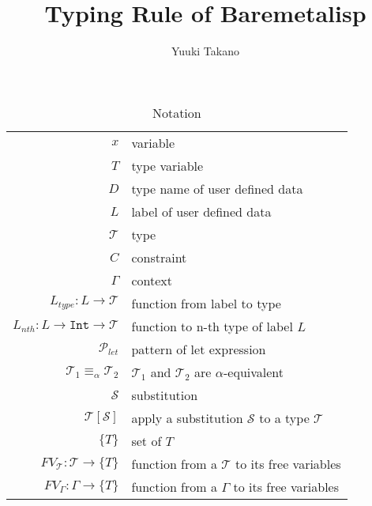 \documentclass{article}
\title{Typing Rule of Baremetalisp}
\author{Yuuki Takano}
\begin{document}
\maketitle

\begin{table}[tb]
\caption{Notation}
    \centering
    \begin{tabular}{rl}
        $x$ & variable \\
        $T$ & type variable \\
        $D$ & type name of user defined data \\
        $L$ & label of user defined data \\
        $\mathcal{T}$ & type \\
        $C$ & constraint \\
        $\Gamma$ & context \\
        $L_{type} : L \rightarrow \mathcal{T}$ & function from label to type \\
        $L_{nth} : L \rightarrow \mathtt{Int} \rightarrow \mathcal{T}$ & function to n-th type of label $L$ \\
        $\mathcal{P}_{let}$ & pattern of let expression \\
        $\mathcal{T}_1 \equiv_\alpha \mathcal{T}_2$ & $\mathcal{T}_1$ and $\mathcal{T}_2$ are $\alpha$-equivalent \\
        $\mathcal{S}$ & substitution \\
        $\mathcal{T}[\mathcal{S}]$ & apply a substitution $\mathcal{S}$ to a type $\mathcal{T}$ \\
        $\{T\}$ & set of $T$ \\
        $FV_\mathcal{T} : \mathcal{T} \rightarrow \{T\}$ & function from a $\mathcal{T}$ to its free variables\\
        $FV_\Gamma : \Gamma \rightarrow \{T\}$ & function from a $\Gamma$ to its free variables\\
    \end{tabular}
\end{table}
\end{document}
